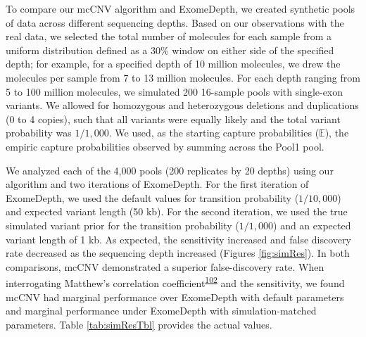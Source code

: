 \documentclass[11pt,letterpaper,oneside]{book}
\begin{document}
To compare our mcCNV algorithm and ExomeDepth, we created synthetic pools of data across different sequencing depths.
Based on our observations with the real data, we selected the total number of molecules for each sample from a uniform distribution defined as a 30\% window on either side of the specified depth; for example, for a specified depth of 10 million molecules, we drew the molecules per sample from 7 to 13 million molecules.
For each depth ranging from 5 to 100 million molecules, we simulated 200 16-sample pools with single-exon variants.
We allowed for homozygous and heterozygous deletions and duplications (0 to 4 copies), such that all variants were equally likely and the total variant probability was \(1/1,000\).
We used, as the starting capture probabilities (\(\mathbb{E}\)), the empiric capture probabilities observed by summing across the Pool1 pool.

We analyzed each of the 4,000 pools (200 replicates by 20 depths) using our algorithm and two iterations of ExomeDepth.
For the first iteration of ExomeDepth, we used the default values for transition probability (\(1/10,000\)) and expected variant length (50 kb).
For the second iteration, we used the true simulated variant prior for the transition probability (\(1/1,000\)) and an expected variant length of 1 kb.
As expected, the sensitivity increased and false discovery rate decreased as the sequencing depth increased (Figures \ref{fig:simRes}).
In both comparisons, mcCNV demonstrated a superior false-discovery rate.
When interrogating Matthew's correlation coefficient\textsuperscript{\protect\hyperlink{ref-matthews:1975aa}{102}} and the sensitivity, we found mcCNV had marginal performance over ExomeDepth with default parameters and marginal performance under ExomeDepth with simulation-matched parameters. Table \ref{tab:simResTbl} provides the actual values.
\end{document}
